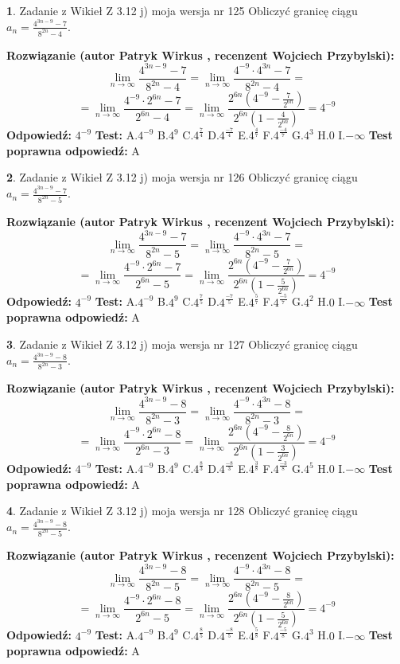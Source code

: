 \documentclass[12pt, a4paper]{article}
\theoremstyle{definition} %
\newtheorem{zad}{}
\newcommand{\zadStart}[1]{\begin{zad}#1\newline}
\newcommand{\zadStop}{\end{zad}}
\newcommand{\rozwStart}[2]{\noindent \textbf{Rozwiązanie (autor #1 , recenzent #2): }\newline}
\newcommand{\rozwStop}{\newline}
\newcommand{\odpStart}{\noindent \textbf{Odpowiedź:}\newline}
\newcommand{\odpStop}{\newline}
\newcommand{\testStart}{\noindent \textbf{Test:}\newline}
\newcommand{\testStop}{\newline}
\newcommand{\kluczStart}{\noindent \textbf{Test poprawna odpowiedź:}\newline}
\newcommand{\kluczStop}{\newline}
\begin{document}
\zadStart{Zadanie z Wikieł Z 3.12 j) moja wersja nr 125}
Obliczyć granicę ciągu $a_{n}=\frac{4^{3n-9}-7}{8^{2n}-4}$.
\zadStop
\rozwStart{Patryk Wirkus}{Wojciech Przybylski}
$$\lim\limits_{n\to\infty}\frac{4^{3n-9}-7}{8^{2n}-4}= \lim\limits_{n\to\infty}\frac{4^{-9} \cdot 4^{3n}-7}{8^{2n}-4}=$$
$$= \lim\limits_{n\to\infty}\frac{4^{-9} \cdot 2^{6n}-7}{2^{6n}-4}= \lim\limits_{n\to\infty}\frac{2^{6n}(4^{-9} - \frac{7}{2^{6n}})}{2^{6n}(1-\frac{4}{2^{6n}})}= 4^{-9}$$
\rozwStop
\odpStart
$4^{-9}$
\odpStop
\testStart
A.$4^{-9}$
B.$4^{9}$
C.$4^{\frac{7}{4}}$
D.$4^{\frac{-7}{4}}$
E.$4^{\frac{4}{7}}$
F.$4^{\frac{-4}{7}}$
G.$4^{3}$
H.$0$
I.$-\infty$
\testStop
\kluczStart
A
\kluczStop



\zadStart{Zadanie z Wikieł Z 3.12 j) moja wersja nr 126}
Obliczyć granicę ciągu $a_{n}=\frac{4^{3n-9}-7}{8^{2n}-5}$.
\zadStop
\rozwStart{Patryk Wirkus}{Wojciech Przybylski}
$$\lim\limits_{n\to\infty}\frac{4^{3n-9}-7}{8^{2n}-5}= \lim\limits_{n\to\infty}\frac{4^{-9} \cdot 4^{3n}-7}{8^{2n}-5}=$$
$$= \lim\limits_{n\to\infty}\frac{4^{-9} \cdot 2^{6n}-7}{2^{6n}-5}= \lim\limits_{n\to\infty}\frac{2^{6n}(4^{-9} - \frac{7}{2^{6n}})}{2^{6n}(1-\frac{5}{2^{6n}})}= 4^{-9}$$
\rozwStop
\odpStart
$4^{-9}$
\odpStop
\testStart
A.$4^{-9}$
B.$4^{9}$
C.$4^{\frac{7}{5}}$
D.$4^{\frac{-7}{5}}$
E.$4^{\frac{5}{7}}$
F.$4^{\frac{-5}{7}}$
G.$4^{2}$
H.$0$
I.$-\infty$
\testStop
\kluczStart
A
\kluczStop



\zadStart{Zadanie z Wikieł Z 3.12 j) moja wersja nr 127}
Obliczyć granicę ciągu $a_{n}=\frac{4^{3n-9}-8}{8^{2n}-3}$.
\zadStop
\rozwStart{Patryk Wirkus}{Wojciech Przybylski}
$$\lim\limits_{n\to\infty}\frac{4^{3n-9}-8}{8^{2n}-3}= \lim\limits_{n\to\infty}\frac{4^{-9} \cdot 4^{3n}-8}{8^{2n}-3}=$$
$$= \lim\limits_{n\to\infty}\frac{4^{-9} \cdot 2^{6n}-8}{2^{6n}-3}= \lim\limits_{n\to\infty}\frac{2^{6n}(4^{-9} - \frac{8}{2^{6n}})}{2^{6n}(1-\frac{3}{2^{6n}})}= 4^{-9}$$
\rozwStop
\odpStart
$4^{-9}$
\odpStop
\testStart
A.$4^{-9}$
B.$4^{9}$
C.$4^{\frac{8}{3}}$
D.$4^{\frac{-8}{3}}$
E.$4^{\frac{3}{8}}$
F.$4^{\frac{-3}{8}}$
G.$4^{5}$
H.$0$
I.$-\infty$
\testStop
\kluczStart
A
\kluczStop



\zadStart{Zadanie z Wikieł Z 3.12 j) moja wersja nr 128}
Obliczyć granicę ciągu $a_{n}=\frac{4^{3n-9}-8}{8^{2n}-5}$.
\zadStop
\rozwStart{Patryk Wirkus}{Wojciech Przybylski}
$$\lim\limits_{n\to\infty}\frac{4^{3n-9}-8}{8^{2n}-5}= \lim\limits_{n\to\infty}\frac{4^{-9} \cdot 4^{3n}-8}{8^{2n}-5}=$$
$$= \lim\limits_{n\to\infty}\frac{4^{-9} \cdot 2^{6n}-8}{2^{6n}-5}= \lim\limits_{n\to\infty}\frac{2^{6n}(4^{-9} - \frac{8}{2^{6n}})}{2^{6n}(1-\frac{5}{2^{6n}})}= 4^{-9}$$
\rozwStop
\odpStart
$4^{-9}$
\odpStop
\testStart
A.$4^{-9}$
B.$4^{9}$
C.$4^{\frac{8}{5}}$
D.$4^{\frac{-8}{5}}$
E.$4^{\frac{5}{8}}$
F.$4^{\frac{-5}{8}}$
G.$4^{3}$
H.$0$
I.$-\infty$
\testStop
\kluczStart
A
\kluczStop
\end{document}
